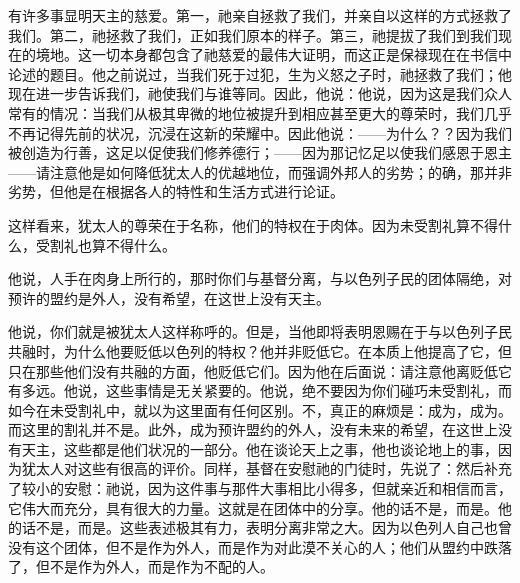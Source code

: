 有许多事显明天主的慈爱。第一，祂亲自拯救了我们，并亲自以这样的方式拯救了我们。第二，祂拯救了我们，正如我们原本的样子。第三，祂提拔了我们到我们现在的境地。这一切本身都包含了祂慈爱的最伟大证明，而这正是保禄现在在书信中论述的题目。他之前说过，当我们死于过犯，生为义怒之子时，祂拯救了我们；他现在进一步告诉我们，祂使我们与谁等同。因此，他说：他说，因为这是我们众人常有的情况：当我们从极其卑微的地位被提升到相应甚至更大的尊荣时，我们几乎不再记得先前的状况，沉浸在这新的荣耀中。因此他说：——为什么？？因为我们被创造为行善，这足以促使我们修养德行；——因为那记忆足以使我们感恩于恩主——请注意他是如何降低犹太人的优越地位，而强调外邦人的劣势；的确，那并非劣势，但他是在根据各人的特性和生活方式进行论证。\par

\par

这样看来，犹太人的尊荣在于名称，他们的特权在于肉体。因为未受割礼算不得什么，受割礼也算不得什么。\par

他说，人手在肉身上所行的，那时你们与基督分离，与以色列子民的团体隔绝，对预许的盟约是外人，没有希望，在这世上没有天主。\par

他说，你们就是被犹太人这样称呼的。但是，当他即将表明恩赐在于与以色列子民共融时，为什么他要贬低以色列的特权？他并非贬低它。在本质上他提高了它，但只在那些他们没有共融的方面，他贬低它们。因为他在后面说：请注意他离贬低它有多远。他说，这些事情是无关紧要的。他说，绝不要因为你们碰巧未受割礼，而如今在未受割礼中，就以为这里面有任何区别。不，真正的麻烦是：成为，成为。而这里的割礼并不是。此外，成为预许盟约的外人，没有未来的希望，在这世上没有天主，这些都是他们状况的一部分。他在谈论天上之事，他也谈论地上的事，因为犹太人对这些有很高的评价。同样，基督在安慰祂的门徒时，先说了：然后补充了较小的安慰：祂说，因为这件事与那件大事相比小得多，但就亲近和相信而言，它伟大而充分，具有很大的力量。这就是在团体中的分享。他的话不是，而是。他的话不是，而是。这些表述极其有力，表明分离非常之大。因为以色列人自己也曾没有这个团体，但不是作为外人，而是作为对此漠不关心的人；他们从盟约中跌落了，但不是作为外人，而是作为不配的人。\par

